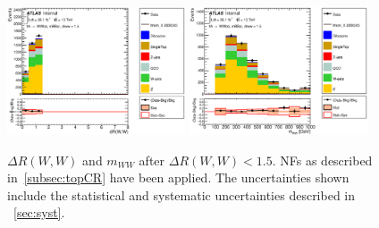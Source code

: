 \begin{figure}[!h]
\begin{center}
\includegraphics*[width=0.47\textwidth] {figures/ControlPlots/reOpt2000/C_mBBcr_reOpt2000_bbpt350_wwpt250_drww15_drww_regionA_met25d020}
\includegraphics*[width=0.47\textwidth] {figures/ControlPlots/reOpt2000/C_mBBcr_reOpt2000_bbpt350_wwpt250_drww15_WWMass_regionA_met25d020.eps}
\caption[$\Delta R(W,W)$and  $m_{WW}$ after $\Delta R(W,W) < 1.5$.]{$\Delta R(W,W)$ and  $m_{WW}$ after $\Delta R(W,W) < 1.5$.  \ttbar NFs as described in~\ref{subsec:topCR} have been applied. The uncertainties shown include the statistical and systematic uncertainties described in ~\ref{sec:syst}.}
\end{center}
\end{figure}

